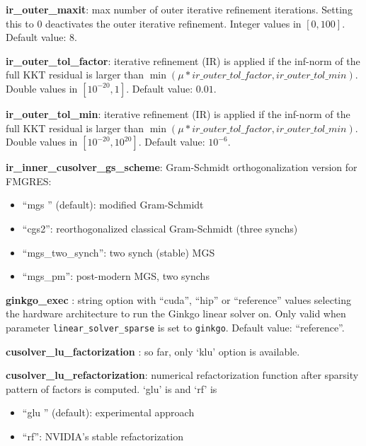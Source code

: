\noindent \textbf{ir\_outer\_maxit}: max number of outer iterative refinement iterations. Setting this to 0 deactivates the outer iterative refinement. Integer values in $[0, 100]$. Default value: $8$.
\medskip

\noindent \textbf{ir\_outer\_tol\_factor}: iterative refinement (IR) is applied if the inf-norm of the full KKT residual is larger than $\min (\mu*ir\_outer\_tol\_factor,ir\_outer\_tol\_min)$. Double values in $[10^{-20}, 1]$. Default value: $0.01$.
\medskip

\noindent \textbf{ir\_outer\_tol\_min}: iterative refinement (IR) is applied if the inf-norm of the full KKT residual is larger than $\min (\mu*ir\_outer\_tol\_factor,ir\_outer\_tol\_min)$. Double values in $[10^{-20}, 10^{20}]$. Default value: $10^{-6}$.
\medskip

\noindent \textbf{ir\_inner\_cusolver\_gs\_scheme}: Gram-Schmidt orthogonalization version for FMGRES:
\begin{itemize}
\item ``mgs '' (default): modified Gram-Schmidt
\item ``cgs2'': reorthogonalized classical Gram-Schmidt (three synchs)
\item ``mgs\_two\_synch'': two synch (stable) MGS
\item ``mgs\_pm'': post-modern MGS, two synchs
\end{itemize}
\medskip

\noindent \textbf{ginkgo\_exec }: string option with ``cuda'', ``hip'' or ``reference'' values selecting the hardware architecture to run the Ginkgo linear solver on. Only valid when parameter \texttt{linear\_solver\_sparse} is set to \texttt{ginkgo}. Default value: ``reference''.
\medskip

\noindent \textbf{cusolver\_lu\_factorization }: so far, only `klu' option is available.
\medskip

\noindent \textbf{cusolver\_lu\_refactorization}: numerical refactorization function after sparsity pattern of factors is computed. `glu' is  and `rf' is 
\begin{itemize}
\item ``glu '' (default): experimental approach
\item ``rf'': NVIDIA's stable refactorization
\end{itemize}
\medskip

